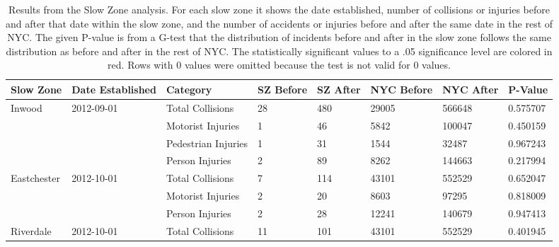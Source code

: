 \documentclass[10pt,journal,compsoc]{IEEEtran}
\begin{document}
\begin{table}[]
\centering
\caption{Results from the Slow Zone analysis.  For each slow zone it shows the date established, number of collisions or injuries before and after that date within the slow zone, and the number of accidents or injuries before and after the same date in the rest of NYC.  The given P-value is from a G-test that the distribution of incidents before and after in the slow zone follows the same distribution as before and after in the rest of NYC.  The statistically significant values to a .05 significance level are colored in red. Rows with 0 values were omitted because the test is not valid for 0 values.}
\label{tab:sz}
\begin{tabular}{|l|l|l|l|l|l|l|l|}
\hline
Slow Zone                                      & Date Established            & Category            & SZ Before & SZ After & NYC Before & NYC After & P-Value  \\ \hline
\multirow{4}{*}{Inwood}                        & \multirow{4}{*}{2012-09-01} & Total Collisions    & 28        & 480      & 29005      & 566648    & 0.575707 \\ \cline{3-8} 
                                               &                             & Motorist Injuries   & 1         & 46       & 5842       & 100047    & 0.450159 \\ \cline{3-8} 
                                               &                             & Pedestrian Injuries & 1         & 31       & 1544       & 32487     & 0.967243 \\ \cline{3-8} 
                                               &                             & Person Injuries     & 2         & 89       & 8262       & 144663    & 0.217994 \\ \hline
\multirow{3}{*}{Eastchester}                   & \multirow{3}{*}{2012-10-01} & Total Collisions    & 7         & 114      & 43101      & 552529    & 0.652047 \\ \cline{3-8} 
                                               &                             & Motorist Injuries   & 2         & 20       & 8603       & 97295     & 0.818009 \\ \cline{3-8} 
                                               &                             & Person Injuries     & 2         & 28       & 12241      & 140679    & 0.947413 \\ \hline
Riverdale                                      & 2012-10-01                  & Total Collisions    & 11        & 101      & 43101      & 552529    & 0.401945 \\ \hline

\end{tabular}
\end{table}
\end{document}

